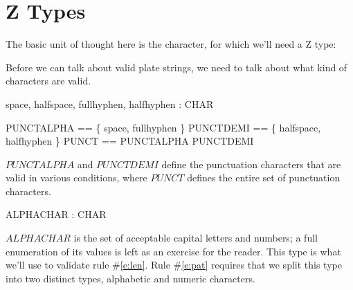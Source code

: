 \documentclass[11pt]{article}
\begin{document}
\section{Z Types}
\begin{spec}
  The basic unit of thought here is the character, for which we'll need a Z type:

  \begin{zed}
    [CHAR]
  \end{zed}

  Before we can talk about valid plate strings, we need to talk about what kind of characters are
  valid.  

  \begin{axdef}
    space, halfspace, fullhyphen, halfhyphen : CHAR
  \end{axdef}

  \begin{zed}
    PUNCTALPHA == \{ space, fullhyphen \} \also
    PUNCTDEMI == \{ halfspace, halfhyphen \} \also
    PUNCT == PUNCTALPHA \cup PUNCTDEMI
  \end{zed}

  $PUNCTALPHA$ and $PUNCTDEMI$ define the punctuation characters that are valid in various
  conditions, where $PUNCT$ defines the entire set of punctuation characters.


  \begin{axdef}
    ALPHACHAR : \power CHAR
  \end{axdef}

  $ALPHACHAR$ is the set of acceptable capital letters and numbers; a full enumeration of its values
  is left as an exercise for the reader.  This type is what we'll use to validate rule
  \#\ref{e:len}.  Rule \#\ref{e:pat} requires that we split this type into two distinct types,
  alphabetic and numeric characters.

\end{spec}
\end{document}
